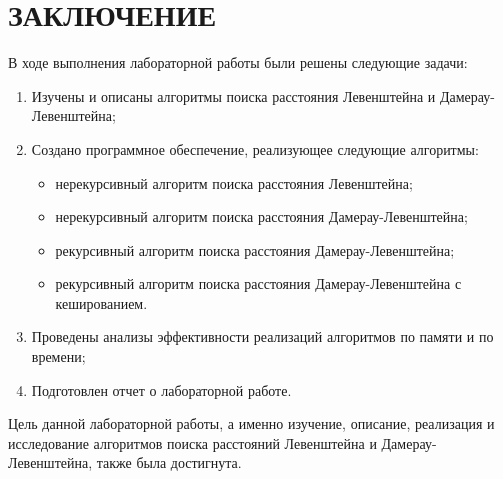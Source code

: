 \chapter*{ЗАКЛЮЧЕНИЕ}

В ходе выполнения лабораторной работы были решены следующие задачи:

\begin{enumerate}[label={\arabic*)}]
	\item Изучены и описаны алгоритмы поиска расстояния Левенштейна и Дамерау-Левенштейна;
	\item Создано программное обеспечение, реализующее следующие алгоритмы:
	\begin{itemize}[label=---]
		\item нерекурсивный алгоритм поиска расстояния Левенштейна;
		\item нерекурсивный алгоритм поиска расстояния Дамерау-Левенштейна;
		\item рекурсивный алгоритм поиска расстояния Дамерау-Левенштейна;
		\item рекурсивный алгоритм поиска расстояния Дамерау-Левенштейна с кешированием.
	\end{itemize}
	\item Проведены анализы эффективности реализаций алгоритмов по памяти и по времени;
	\item Подготовлен отчет о лабораторной работе.
\end{enumerate}

Цель данной лабораторной работы, а именно изучение, описание, реализация и исследование алгоритмов поиска расстояний Левенштейна и Дамерау-Левенштейна, также была достигнута.